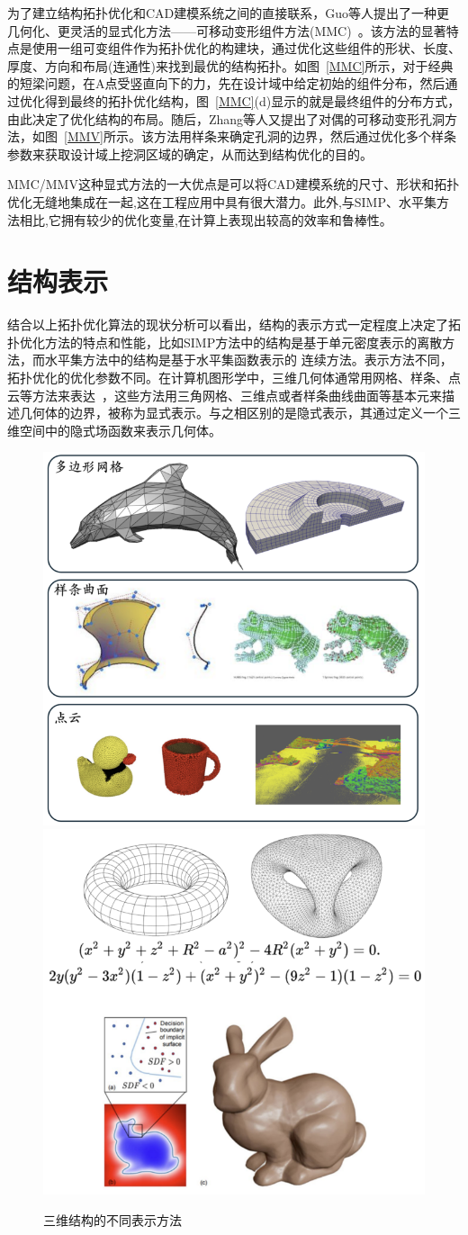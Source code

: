为了建立结构拓扑优化和CAD建模系统之间的直接联系，Guo等人提出了一种更几何化、更灵活的显式化方法——可移动变形组件方法(MMC)~\cite{Zhang2014}。该方法的显著特点是使用一组可变组件作为拓扑优化的构建块，通过优化这些组件的形状、长度、厚度、方向和布局(连通性)来找到最优的结构拓扑。如图~\ref{MMC}所示，对于经典的短梁问题，在A点受竖直向下的力，先在设计域中给定初始的组件分布，然后通过优化得到最终的拓扑优化结构，图~\ref{MMC}(d)显示的就是最终组件的分布方式，由此决定了优化结构的布局。随后，Zhang等人又提出了对偶的可移动变形孔洞方法，如图~\ref{MMV}所示。该方法用样条来确定孔洞的边界，然后通过优化多个样条参数来获取设计域上挖洞区域的确定，从而达到结构优化的目的。

MMC/MMV这种显式方法的一大优点是可以将CAD建模系统的尺寸、形状和拓扑优化无缝地集成在一起,这在工程应用中具有很大潜力。此外,与SIMP、水平集方法相比,它拥有较少的优化变量,在计算上表现出较高的效率和鲁棒性。


\section{结构表示}
结合以上拓扑优化算法的现状分析可以看出，结构的表示方式一定程度上决定了拓扑优化方法的特点和性能，比如SIMP方法中的结构是基于单元密度表示的离散方法，而水平集方法中的结构是基于水平集函数表示的 连续方法。表示方法不同，拓扑优化的优化参数不同。在计算机图形学中，三维几何体通常用网格、样条、点云等方法来表达~\cite{agoston2005computer}，这些方法用三角网格、三维点或者样条曲线曲面等基本元来描述几何体的边界，被称为显式表示。与之相区别的是隐式表示，其通过定义一个三维空间中的隐式场函数来表示几何体。
\begin{figure}[htbp]
    \centering
    \includegraphics[width=0.48\linewidth]{./figures/intro-explicit-rep}\hfill
    \includegraphics[width=0.48\linewidth]{./figures/intro-implicit-rep}
    \\
    \hfill
    \caption{三维结构的不同表示方法}
    \label{fig:structure-rep}
\end{figure}
